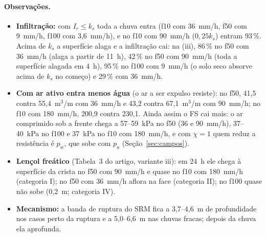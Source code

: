\paragraph{Observações.}
\begin{itemize}
  \item \textbf{Infiltração:} com $I_r \le k_s$ toda a chuva entra (f10 com 36~mm/h, f50 com 9~mm/h, f100 com
    3,6~mm/h), e no f10 com 90~mm/h ($0{,}25k_s$) entram 93\,\%. Acima de $k_s$ a superfície alaga e a infiltração
    cai: na (iii), 86\,\% no f50 com 36~mm/h (alaga a partir de 11~h), 42\,\% no f50 com 90~mm/h (toda a superfície
    alagada em 4~h), 95\,\% no f100 com 9~mm/h (o solo seco absorve acima de $k_s$ no começo) e 29\,\% com 36~mm/h.
  \item \textbf{Com ar ativo entra menos água} (o ar a ser expulso resiste): no f50, 41,5 contra 55,4~m$^3$/m com
    36~mm/h e 43,2 contra 67,1~m$^3$/m com 90~mm/h; no f10 com 180~mm/h, 200,9 contra 230,1. Ainda assim o FS cai
    mais: o ar comprimido sob a frente chega a 57--59~kPa no f50 (36 e 90~mm/h), 37--40~kPa no f100 e 37~kPa no f10
    com 180~mm/h, e com $\chi = 1$ quem reduz a resistência é $p_w$, que sobe com $p_a$ (Seção~\ref{sec:campos}).
  \item \textbf{Lençol freático} (Tabela~3 do artigo, variante iii): em 24~h ele chega à superfície da crista no f50
    com 90~mm/h e quase no f10 com 180~mm/h (categoria I); no f50 com 36~mm/h aflora na face (categoria II); no f100
    quase não sobe (0,2~m; categoria IV).
  \item \textbf{Mecanismo:} a banda de ruptura do SRM fica a 3,7--4,6~m de profundidade nos casos perto da ruptura e a
    5,0--6,6~m nas chuvas fracas; depois da chuva ela aprofunda.
\end{itemize}
